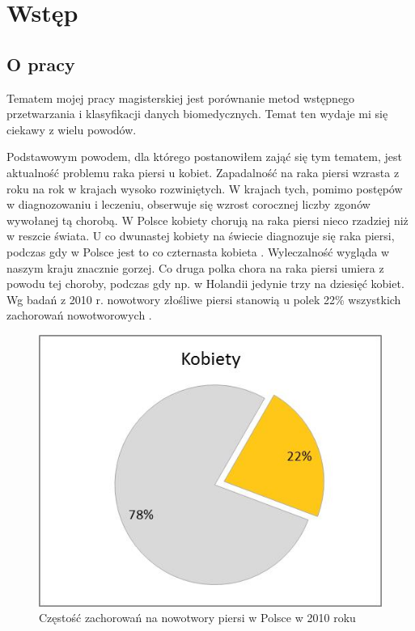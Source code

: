 \documentclass[../thesis.tex]{subfiles}
\begin{document}
\pagestyle{plain}

\chapter{Wstęp}
\label{intro}

\section{O pracy}

Tematem mojej pracy magisterskiej jest porównanie metod wstępnego przetwarzania i klasyfikacji danych biomedycznych. Temat ten wydaje mi się ciekawy z wielu powodów.

Podstawowym powodem, dla którego postanowiłem zająć się tym tematem, jest aktualność problemu raka piersi u kobiet. Zapadalność na raka piersi wzrasta z roku na rok w krajach wysoko rozwiniętych. W krajach tych, pomimo postępów w diagnozowaniu i leczeniu, obserwuje się wzrost corocznej liczby zgonów wywołanej tą chorobą. W Polsce kobiety chorują na raka piersi nieco rzadziej niż w reszcie świata. U co dwunastej kobiety na świecie diagnozuje się raka piersi, podczas gdy w Polsce jest to co czternasta kobieta \cite{cancer_web_a}.  Wyleczalność wygląda w naszym kraju znacznie gorzej. Co druga polka chora na raka piersi umiera z powodu tej choroby, podczas gdy np. w Holandii jedynie trzy na dziesięć kobiet. Wg badań z 2010 r. nowotwory złośliwe piersi stanowią u polek 22\% wszystkich zachorowań nowotworowych \cite{cancer_web_b}.

\begin{figure}[h]
\centering
\includegraphics{zachorowalnosc.jpg}
\caption{Częstość zachorowań na nowotwory piersi w Polsce w 2010 roku}
\label{intro:cancer_chart}
\end{figure}
\end{document}
